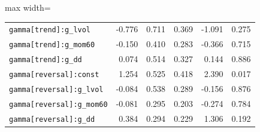 \begin{table}[!htbp]
\begin{adjustbox}{max width=\textwidth}
\begin{tabular}{lrrrrr}
\texttt{gamma[trend]:g\_lvol} & -0.776 & 0.711 & 0.369 & -1.091 & 0.275\\
\texttt{gamma[trend]:g\_mom60} & -0.150 & 0.410 & 0.283 & -0.366 & 0.715\\
\texttt{gamma[trend]:g\_dd} & 0.074 & 0.514 & 0.327 & 0.144 & 0.886\\
\texttt{gamma[reversal]:const} & 1.254 & 0.525 & 0.418 & 2.390 & 0.017\\
\texttt{gamma[reversal]:g\_lvol} & -0.084 & 0.538 & 0.289 & -0.156 & 0.876\\
\texttt{gamma[reversal]:g\_mom60} & -0.081 & 0.295 & 0.203 & -0.274 & 0.784\\
\texttt{gamma[reversal]:g\_dd} & 0.384 & 0.294 & 0.229 & 1.306 & 0.192\\
\bottomrule
\end{tabular}
\end{adjustbox}
\end{table}